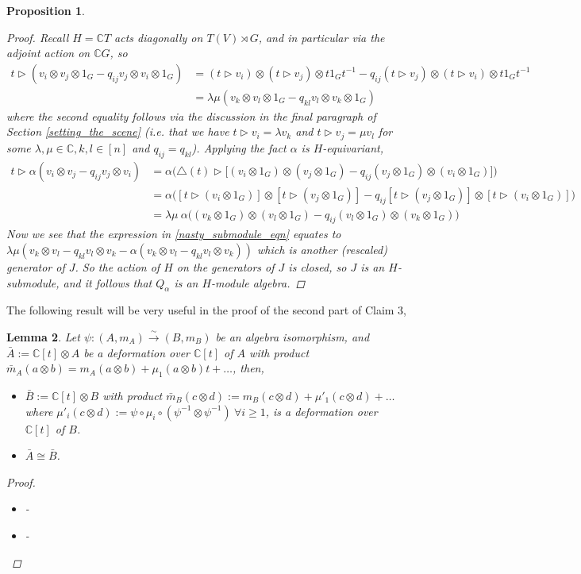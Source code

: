 \documentclass[10pt]{article}
\newcommand{\nt}{\noindent}
\newcommand{\Cc }{\mathbb{C}}
\newcommand{\xrt}{\xrightarrow}
\newtheorem{lemma}{Lemma}[section]
\newtheorem{proposition}[lemma]{Proposition}
\theoremstyle{definition}
\begin{document}
\begin{proposition}
\begin{proof}
\nt Recall $H=\Cc  T$ acts diagonally on $T(V)\rtimes G$, and in particular via the adjoint action on $\Cc  G$, so 
\begin{align*}
t \rhd (v_i\otimes v_j\otimes 1_G-q_{ij}v_j\otimes v_i\otimes 1_G) & = (t\rhd v_i)\otimes (t\rhd v_j)\otimes t1_Gt^{-1} -q_{ij}(t\rhd v_j)\otimes (t\rhd v_i)\otimes t1_Gt^{-1}\\
& = \lambda\mu (v_k\otimes v_l\otimes 1_G-q_{kl}v_l\otimes v_k\otimes 1_G)
\end{align*}
where the second equality follows via the discussion in the final paragraph of Section \ref{setting_the_scene} (i.e. that we have $t\rhd v_i=\lambda v_k$ and $t\rhd v_j=\mu v_l$ for some $\lambda,\mu\in \Cc , k,l\in [n]$ and $q_{ij}=q_{kl}$). Applying the fact $\alpha$ is $H$-equivariant,
\begin{align*}
t\rhd \alpha(v_i\otimes v_j-q_{ij}v_j\otimes v_i) & =\alpha\Big(\triangle(t)\rhd \big[(v_i\otimes 1_G)\otimes (v_j\otimes 1_G)-q_{ij}(v_j\otimes 1_G)\otimes (v_i\otimes 1_G)\big]\Big)\\
& = \alpha\Big([t\rhd (v_i\otimes 1_G)]\otimes [t\rhd (v_j\otimes 1_G)]-q_{ij}[t\rhd (v_j\otimes 1_G)]\otimes [t\rhd (v_i\otimes 1_G)]\Big)\\
& = \lambda\mu\ \alpha\Big((v_k\otimes 1_G)\otimes (v_l\otimes 1_G)-q_{ij}(v_l\otimes 1_G)\otimes (v_k\otimes 1_G)\Big)
\end{align*}
Now we see that the expression in \eqref{nasty_submodule_eqn} equates to $\lambda\mu(v_k\otimes v_l-q_{kl}v_l\otimes v_k-\alpha(v_k\otimes v_l-q_{kl}v_l\otimes v_k))$ which is another (rescaled) generator of $J$. So the action of $H$ on the generators of $J$ is closed, so $J$ is an $H$-submodule, and it follows that $Q_\alpha$ is an $H$-module algebra.
\end{proof}
\end{proposition}

\nt The following result will be very useful in the proof of the second part of Claim 3,

\begin{lemma}\label{main_theorem_crux} Let $\psi:(A,m_A)\xrt{\sim} (B,m_B)$ be an algebra isomorphism, and $\bar A:=\Cc[t]\otimes A$ be a deformation over $\Cc[t]$ of $A$ with product $\bar m_A(a\otimes b)=m_A(a\otimes b)+\mu_1(a\otimes b)t+\dots$, then,
\begin{itemize}
  \item $\bar B:=\Cc[t]\otimes B$ with product $\bar m_B(c\otimes d):=m_B(c\otimes d)+\mu'_1(c\otimes d)+\dots $ where $\mu'_i(c\otimes d):=\psi\circ \mu_i\circ (\psi^{-1}\otimes \psi^{-1})\ \forall i\geq 1$, is a deformation over $\Cc[t]$ of $B$.
  \item $\bar A\cong \bar B$.
\end{itemize}
\begin{proof}
\begin{itemize}
  \item -
  \item -
\end{itemize}
\end{proof}
\end{lemma}
  
\end{document}
